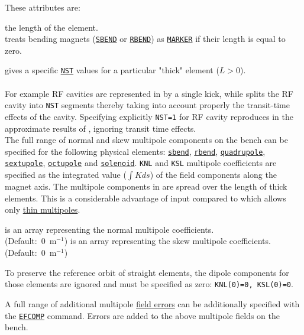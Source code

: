 These attributes are:
\begin{madlist}
   the length of the element. \\ \ptc treats bending magnets
  (\hyperref[sec:bend]{\texttt{SBEND}} or \hyperref[sec:bend]{\texttt{RBEND}})
  as \hyperref[sec:marker]{\texttt{MARKER}} if their length is equal to zero. 
     
   gives a specific \hyperref[sec:ptc-twiss]{\texttt{NST}}
  values for a particular "thick" element ($L > 0$). \\
  \\
  For example RF cavities are represented in \madx 
  by a single kick, while \ptc splits the RF cavity into
  \texttt{NST} segments thereby taking into account properly the
  transit-time effects of the cavity. Specifying explicitly \texttt{NST=1}
  for RF cavity reproduces in \ptc the approximate results of \madx,
  ignoring transit time effects.
  \\

   The full range of  normal and skew multipole
  components on the bench can be  specified for the following physical
  elements: 
  \hyperref[sec:bend]{\texttt{sbend}}, 
  \hyperref[sec:bend]{\texttt{rbend}},
  \hyperref[sec:quadrupole]{\texttt{quadrupole}},
  \hyperref[sec:sextupole]{\texttt{sextupole}},  
  \hyperref[sec:octupole]{\texttt{octupole}} and 
  \hyperref[sec:solenoid]{\texttt{solenoid}}. 
  \texttt{KNL} and \texttt{KSL} multipole coefficients are specified as the
  integrated value ($\int K ds$) of the field components along the
  magnet axis. The multipole components in \ptc are spread over
  the length of thick elements. This is a considerable
  advantage of \ptc input compared  to \madx  which allows only
  \hyperref[sec:multipole]{thin multipoles}. 
  \begin{madlist}
     is an array representing the normal multipole
    coefficients. \\ (Default:~0~m$^{-1}$)
     is an array representing the skew multipole
    coefficients. \\ (Default:~0~m$^{-1}$)
  \end{madlist}
  To preserve the reference orbit of straight elements, the dipole
  components for those elements are ignored and must be specified as
  zero: \texttt{KNL(0)=0, KSL(0)=0}. 
   
  A full range of additional multipole \hyperref[sec:efcomp]{field
    errors} can be additionally specified with the
  \hyperref[sec:efcomp]{\texttt{EFCOMP}} command. Errors are added to
  the above multipole fields on the bench. 

\end{madlist}


